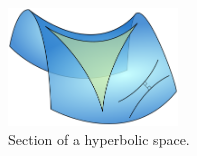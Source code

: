 

\begin{figure}
    \centering
    \includegraphics[width=0.4\textwidth]{figs/Hyperbolic_triangle.png}    
    \caption{Section of a hyperbolic space.}
    \label{fig:hyperbolicSpace}
\end{figure}



    



    
        
    
